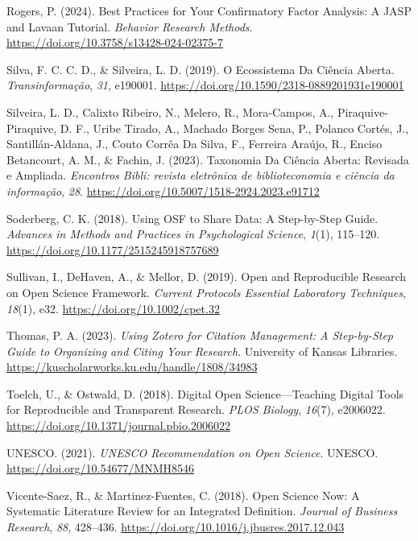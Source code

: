 \documentclass[
  a4paper,
]{book}
\newlength{\cslhangindent}
\newenvironment{CSLReferences}[2] %
 {\begin{list}{}{%
  \setlength{\itemindent}{0pt}
  \setlength{\leftmargin}{0pt}
  \setlength{\parsep}{0pt}
  \ifodd #1
   \setlength{\leftmargin}{\cslhangindent}
   \setlength{\itemindent}{-1\cslhangindent}
  \fi
  \setlength{\itemsep}{#2\baselineskip}}}
 {\end{list}}
\begin{document}
\begin{CSLReferences}{1}{0}
Rogers, P. (2024). Best Practices for Your Confirmatory Factor Analysis:
{A JASP} and Lavaan Tutorial. \emph{Behavior Research Methods}.
\url{https://doi.org/10.3758/s13428-024-02375-7}

Silva, F. C. C. D., \& Silveira, L. D. (2019). O Ecossistema Da
{Ci{ê}ncia Aberta}. \emph{Transinforma{ç}{ã}o}, \emph{31}, e190001.
\url{https://doi.org/10.1590/2318-0889201931e190001}

Silveira, L. D., Calixto Ribeiro, N., Melero, R., Mora-Campos, A.,
Piraquive-Piraquive, D. F., Uribe Tirado, A., Machado Borges Sena, P.,
Polanco Cortés, J., Santillán-Aldana, J., Couto Corrêa Da Silva, F.,
Ferreira Araújo, R., Enciso Betancourt, A. M., \& Fachin, J. (2023).
Taxonomia Da {Ci{ê}ncia Aberta}: Revisada e Ampliada. \emph{Encontros
Bibli: revista eletr{ô}nica de biblioteconomia e ci{ê}ncia da
informa{ç}{ã}o}, \emph{28}.
\url{https://doi.org/10.5007/1518-2924.2023.e91712}

Soderberg, C. K. (2018). Using OSF to Share Data: A Step-by-Step Guide.
\emph{Advances in Methods and Practices in Psychological Science},
\emph{1}(1), 115--120. \url{https://doi.org/10.1177/2515245918757689}

Sullivan, I., DeHaven, A., \& Mellor, D. (2019). Open and Reproducible
Research on Open Science Framework. \emph{Current Protocols Essential
Laboratory Techniques}, \emph{18}(1), e32.
\url{https://doi.org/10.1002/cpet.32}

Thomas, P. A. (2023). \emph{Using Zotero for Citation Management: A
Step-by-Step Guide to Organizing and Citing Your Research}. University
of Kansas Libraries.
\url{https://kuscholarworks.ku.edu/handle/1808/34983}

Toelch, U., \& Ostwald, D. (2018). Digital Open Science---{Teaching}
Digital Tools for Reproducible and Transparent Research. \emph{PLOS
Biology}, \emph{16}(7), e2006022.
\url{https://doi.org/10.1371/journal.pbio.2006022}

UNESCO. (2021). \emph{{UNESCO Recommendation} on {Open Science}}.
UNESCO. \url{https://doi.org/10.54677/MNMH8546}

Vicente-Saez, R., \& Martinez-Fuentes, C. (2018). Open {Science} Now:
{A} Systematic Literature Review for an Integrated Definition.
\emph{Journal of Business Research}, \emph{88}, 428--436.
\url{https://doi.org/10.1016/j.jbusres.2017.12.043}


\end{CSLReferences}
\end{document}

